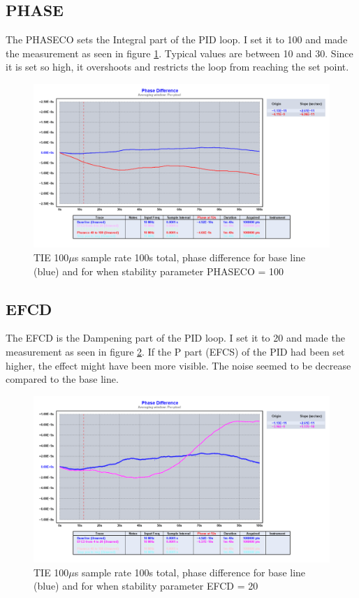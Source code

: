 \documentclass[11pt,english,a4paper]{article}
\begin{document}
\subsection{PHASE}
The PHASECO sets the Integral part of the PID loop. I set it to 100 and made the measurement as seen in figure \ref{fig:PHASE}. Typical values are between 10 and 30. Since it is set so high, it overshoots and restricts the loop from reaching the set point. 

\begin{figure}[!htb]
  \centering
    \includegraphics[width=1\textwidth]{PHASE.png}
      \caption{TIE 100$\mu$s sample rate 100s total, phase difference for base line (blue) and for when stability parameter PHASECO = 100}
          \label{fig:PHASE}
\end{figure}

\subsection{EFCD}
The EFCD is the Dampening part of the PID loop. I set it to 20 and made the measurement as seen in figure \ref{fig:EFCD}. If the P part (EFCS) of the PID had been set higher, the effect might have been more visible. The noise seemed to be decrease compared to the base line.

\begin{figure}[!htb]
  \centering
    \includegraphics[width=1\textwidth]{EFCD.png}
      \caption{TIE 100$\mu$s sample rate 100s total, phase difference for base line (blue) and for when stability parameter EFCD = 20}
          \label{fig:EFCD}
\end{figure}
\end{document}
